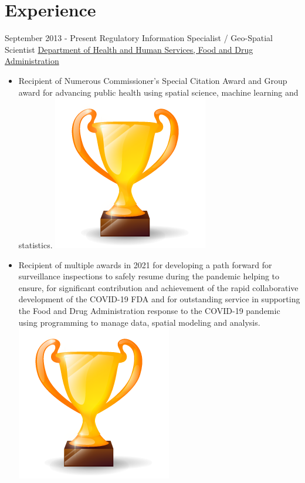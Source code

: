 \documentclass[letterpaper]{twentysecondcv} %
\begin{document}
\section{Experience}
\begin{twenty}
 \twentyitem
    	{September 2013 -}
		{Present}
        {Regulatory Information Specialist / Geo-Spatial Scientist}        {\href{http://www.fda.gov/}{Department of Health and Human Services, Food and Drug Administration 
}}
        {}
        {
        {\begin{itemize}
        


    	\item Recipient of Numerous Commissioner’s Special Citation Award and Group award for advancing public health using spatial science, machine learning and statistics.	\includegraphics[scale=0.05]{img/trophy.png}
\vspace{1mm}
    	\item Recipient of multiple awards in 2021 for developing a path forward for surveillance inspections to safely resume during the pandemic helping to ensure, for significant contribution and achievement of the rapid collaborative development of the COVID-19 FDA and for outstanding service in supporting the Food and Drug Administration response to the COVID-19 pandemic using programming to manage data, spatial modeling and analysis.
	\includegraphics[scale=0.05]{img/trophy.png}

\end{itemize}}}
\end{twenty}
\end{document}
